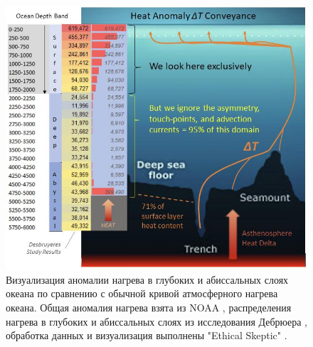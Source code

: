 \documentclass[10pt,twocolumn,letterpaper]{article}
\begin{document}
\begin{figure}[t]
\begin{center}
\includegraphics[width=1\textwidth]{deepsea.jpg}
\end{center}
   \caption{Визуализация аномалии нагрева в глубоких и абиссальных слоях океана по сравнению с обычной кривой атмосферного нагрева океана. Общая аномалия нагрева взята из NOAA \cite{147}, распределения нагрева в глубоких и абиссальных слоях из исследования Дебрюера \cite{132}, обработка данных и визуализация выполнены "Ethical Skeptic" \cite{129}.}
\label{fig:21}
\end{figure}
\end{document}
